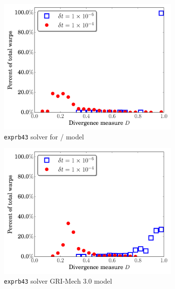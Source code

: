 \documentclass[preprint]{elsarticle}
\begin{document}
\begin{figure}[htb]
\begin{subfigure}{0.49\textwidth}
      \includegraphics[width=\linewidth]{H2_exprb43_div.pdf}
      \caption{\texttt{exprb43} solver for \slash{} model}
      \label{F:exprb43_div_h2}
  \end{subfigure}
  \begin{subfigure}{0.49\textwidth}
      \includegraphics[width=\linewidth]{CH4_exprb43_div.pdf}
      \caption{\texttt{exprb43} solver GRI-Mech 3.0 model}
      \label{F:exprb43_div_ch4}
  \end{subfigure}
  \\
  \begin{subfigure}{0.49\textwidth}

\end{subfigure}
\end{figure}
\end{document}
